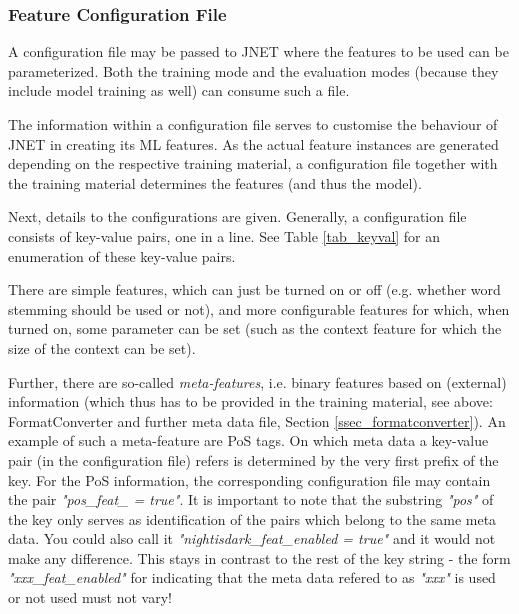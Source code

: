 \documentclass[11pt,a4paper,halfparskip]{scrartcl}
\begin{document}
\subsubsection{Feature Configuration File}
\label{ssec_featconfig}

A configuration file may be passed to JNET where the features to be
used can be parameterized. Both the training mode and the evaluation
modes (because they include model training as well) can consume such a
file.

The information within a configuration file serves to customise the
behaviour of JNET in creating its ML features. As the actual feature
instances are generated depending on the respective training material,
a configuration file together with the training material determines
the features (and thus the model).

Next, details to the configurations are given.  Generally, a
configuration file consists of key-value pairs, one in a line. See
Table \ref{tab_keyval} for an enumeration of these key-value pairs.

There are simple features, which can just be turned on or off (e.g.
whether word stemming should be used or not), and more configurable
features for which, when turned on, some parameter can be set (such as
the context feature for which the size of the context can be set).




Further, there are so-called \textit{meta-features}, i.e. binary
features based on (external) information (which thus has to be
provided in the training material, see above: FormatConverter and
further meta data file, Section \ref{ssec_formatconverter}). An example of such
a meta-feature are PoS tags.  On which meta data a key-value pair (in
the configuration file) refers is determined by the very first prefix
of the key. For the PoS information, the corresponding configuration
file may contain the pair \textit{"pos\_feat\_ = true"}.  It is
important to note that the substring \textit{"pos"} of the key only
serves as identification of the pairs which belong to the same meta
data. You could also call it \textit{"nightisdark\_feat\_enabled =
  true"} and it would not make any difference. This stays in contrast
to the rest of the key string - the form \textit{"xxx\_feat\_enabled"}
for indicating that the meta data refered to as \textit{"xxx"} is
used or not used must not vary!
\end{document}
